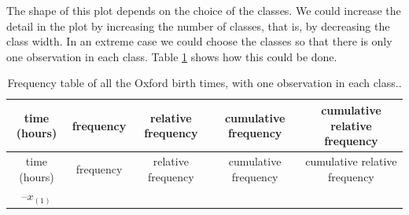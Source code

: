 \documentclass[
  british,
]{book}
\begin{document}
The shape of this plot depends on the choice of the classes. We could increase the detail in the plot by increasing the number of classes, that is, by decreasing the class width. In an extreme case we could choose the classes so that there is only one observation in each class. Table \ref{tab:oxfreqecdf} shows how this could be done.

\begin{longtable}[]{@{}ccccc@{}}
\caption{\label{tab:oxfreqecdf} Frequency table of all the Oxford birth times, with one observation in each class..}\tabularnewline
\toprule
\begin{minipage}[b]{0.19\columnwidth}\centering
time (hours)\strut
\end{minipage} & \begin{minipage}[b]{0.17\columnwidth}\centering
frequency\strut
\end{minipage} & \begin{minipage}[b]{0.17\columnwidth}\centering
relative frequency\strut
\end{minipage} & \begin{minipage}[b]{0.17\columnwidth}\centering
cumulative frequency\strut
\end{minipage} & \begin{minipage}[b]{0.17\columnwidth}\centering
cumulative relative frequency\strut
\end{minipage}\tabularnewline
\midrule
\endfirsthead
\toprule
\begin{minipage}[b]{0.19\columnwidth}\centering
time (hours)\strut
\end{minipage} & \begin{minipage}[b]{0.17\columnwidth}\centering
frequency\strut
\end{minipage} & \begin{minipage}[b]{0.17\columnwidth}\centering
relative frequency\strut
\end{minipage} & \begin{minipage}[b]{0.17\columnwidth}\centering
cumulative frequency\strut
\end{minipage} & \begin{minipage}[b]{0.17\columnwidth}\centering
cumulative relative frequency\strut
\end{minipage}\tabularnewline
\midrule
\endhead
\begin{minipage}[t]{0.19\columnwidth}\centering
0--\(x_{(1)}\)\strut
\end{minipage} & \begin{minipage}[t]{0.17\columnwidth}\centering

\end{minipage}
\end{longtable}
\end{document}
